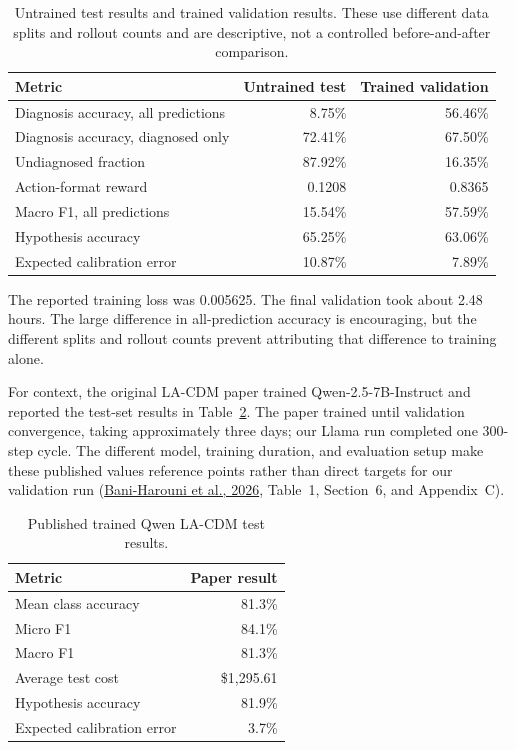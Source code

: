 \documentclass[11pt]{article}
\begin{document}
\begin{table}[ht]
  \centering
  \caption{Untrained test results and trained validation results. These use
  different data splits and rollout counts and are descriptive, not a
  controlled before-and-after comparison.}
  \label{tab:validation}
  \begin{tabular}{lrr}
    \toprule
    Metric & Untrained test & Trained validation \\
    \midrule
    Diagnosis accuracy, all predictions & 8.75\% & 56.46\% \\
    Diagnosis accuracy, diagnosed only & 72.41\% & 67.50\% \\
    Undiagnosed fraction & 87.92\% & 16.35\% \\
    Action-format reward & 0.1208 & 0.8365 \\
    Macro F1, all predictions & 15.54\% & 57.59\% \\
    Hypothesis accuracy & 65.25\% & 63.06\% \\
    Expected calibration error & 10.87\% & 7.89\% \\
    \bottomrule
  \end{tabular}
\end{table}

The reported training loss was 0.005625. The final validation took about
2.48 hours. The large difference in all-prediction accuracy is encouraging,
but the different splits and rollout counts prevent attributing that
difference to training alone.

For context, the original LA-CDM paper trained Qwen-2.5-7B-Instruct and
reported the test-set results in Table~\ref{tab:paper}. The paper trained
until validation convergence, taking approximately three days; our Llama run
completed one 300-step cycle. The different model, training duration, and
evaluation setup make these published values reference points rather than
direct targets for our validation run
(\href{https://arxiv.org/abs/2506.13474}{Bani-Harouni et al., 2026},
Table~1, Section~6, and Appendix~C).

\begin{table}[ht]
  \centering
  \caption{Published trained Qwen LA-CDM test results.}
  \label{tab:paper}
  \begin{tabular}{lr}
    \toprule
    Metric & Paper result \\
    \midrule
    Mean class accuracy & 81.3\% \\
    Micro F1 & 84.1\% \\
    Macro F1 & 81.3\% \\
    Average test cost & \$1,295.61 \\
    Hypothesis accuracy & 81.9\% \\
    Expected calibration error & 3.7\% \\
    \bottomrule
  \end{tabular}
\end{table}
\end{document}
